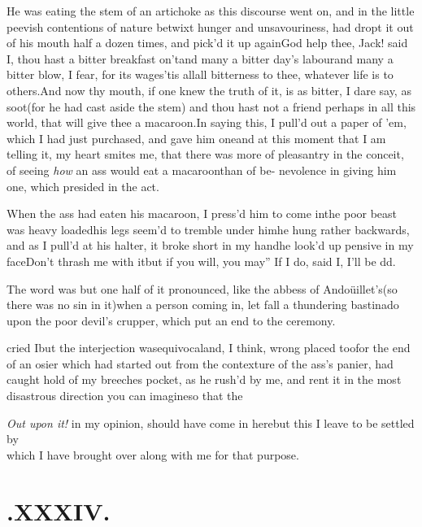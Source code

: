 \documentclass{article}
\begin{document}
He was eating the stem of an artichoke as this discourse went on, and in the little
peevish contentions of nature\pb
betwixt hunger and unsavouriness, had dropt it out of his mouth
half a dozen times, and pick’d it up again\tsh God help thee,
Jack! said I, thou hast a bitter breakfast on’t\tsk and many a
bitter day’s labour\tsk and many a bitter blow, I fear, for its
wages\tsh ’tis all\tsk all bitterness to thee, whatever life is
to others.\break \tsh And now thy mouth, if one knew the truth
of it, is as bitter, I dare say, as soot\tsk (for he had cast
aside the stem) and thou hast not a friend perhaps in all this
world, that will give thee a macaroon.\tsh In saying this, I
pull’d out a paper of ’em, which I had just purchased, and gave
him one\tsk and at this moment that I am telling it, my heart
smites me, that there was more of pleasantry in the conceit, of
seeing \textit{how} an ass would eat a macaroon\tsh than of
be-\pb
nevolence in giving him one, which presided in the act.

When the ass had eaten his macaroon, I press’d him to come in\tsh the poor beast
was heavy loaded\tsh his legs seem’d to tremble under him\tsh he hung rather
backwards, and as I pull’d at his halter, it broke short in my
hand\tsh he look’d\break
up pensive in my face\tsk \lqq Don’t thrash\break
\lqq me with it\tsk but if you will, you may”\break
\tsh If I do, said I, I’ll be d\tsk d.

The word was but one half of it pronounced, like the abbess of Andoüillet’s\tsk (so
there was no sin in it)\tsk when a person coming in, let fall a thundering bastinado
upon the poor devil’s crupper, which put an end to the
ceremony.\\[6pt]

\newpage
\noindent
cried I\tsh but the interjection was\break equivocal\tsh and, I think,
wrong placed too\tsk for the end of an osier which had started out from the contexture of the ass’s
panier, had caught hold of my breeches pocket, as he rush’d by me, and rent it in
the most disastrous direction you can imagine\tsh so that the

\textit{Out upon it!} in my opinion, should have come in here\tsh but this I leave
to be settled by\\[4pt]
\break
which I have brought over along with me for that
purpose.

\newpage
\section{.\enspace XXXIV.}
\end{document}

